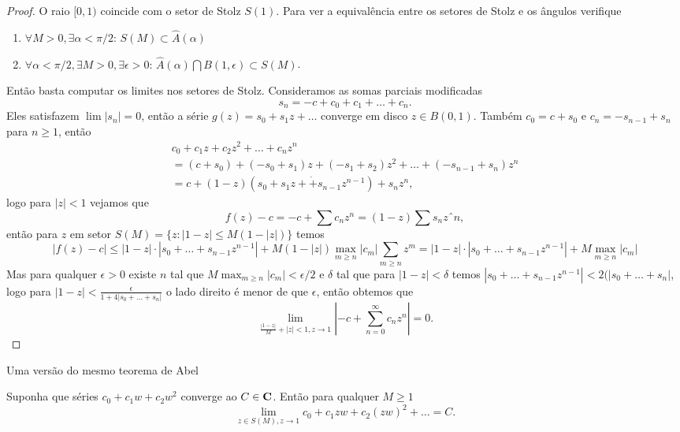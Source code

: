 \begin{proof}
O raio $[0,1)$ coincide com o setor de Stolz $S(1)$.
Para ver a equivalência entre os setores de Stolz e os ângulos verifique
\begin{problema}
\begin{enumerate}
\item $\forall M>0, \exists \alpha<\pi/2: \, S(M) \subset \widehat{A}(\alpha)$
\item $\forall \alpha<\pi/2, \exists M>0,\exists \epsilon>0: \, \widehat{A}(\alpha) \bigcap B(1,\epsilon) \subset S(M)$.
\end{enumerate}
\end{problema}

Então basta computar os limites nos setores de Stolz.
Consideramos as somas parciais modificadas
\[ s_n = -c + c_0 + c_1  + \dots + c_n .\]
Eles satisfazem $\lim |s_n| = 0$, então a série $g(z) = s_0 + s_1 z + \dots$
converge em disco $z\in B(0,1)$.
Também $c_0 = c + s_0$ e $c_n = -s_{n-1} + s_n$ para $n\geq 1$, então
\begin{multline*}
            c_0  +         c_1 z +       c_2 z^2 + \dots +           c_n z^n  
\\ = (c       + s_0) + (-s_0 + s_1)z + (-s_1+s_2)z^2 + \dots + (-s_{n-1}+s_n)z^n
\\ =  c + (1-z)(s_0  +         s_1 z + \dot                 + s_{n-1} z^{n-1}) + s_n z^n,
\end{multline*}
logo para $|z|<1$ vejamos que
\[ f(z) -c = -c + \sum c_n z^n = (1-z) \sum s_n zˆn, \]
então para $z$ em setor $S(M) = \{z : |1-z|\leq M(1-|z|)\}$ temos
\[ |f(z) - c| \leq |1-z|\cdot|s_0+\dots+s_{n-1}z^{n-1}| + M(1-|z|)\max_{m\geq n} |c_m| \sum_{m\geq n} z^m
= |1-z|\cdot|s_0+\dots+s_{n-1}z^{n-1}| + M \max_{m\geq n} |c_m| \]
Mas para qualquer $\epsilon>0$ existe $n$ tal que $M \max_{m\geq n} |c_m| < \epsilon/2$
e $\delta$ tal que para $|1-z|<\delta$ temos $|s_0+\dots+s_{n-1}z^{n-1}|<2(|s_0+\dots+s_n|$,
logo para $|1-z|<\frac{\epsilon}{1+4|s_0+\dots+s_n|}$ o lado direito é menor de que $\epsilon$,
então obtemos que 
\[ \lim_{\frac{|1-z|}M + |z|<1,z\to 1} |-c+\sum_{n=0}^\infty c_n z^n| = 0. \]
\end{proof}

Uma versão do mesmo teorema de Abel
\begin{teorema}
Suponha que séries $c_0 + c_1 w + c_2 w^2$ converge ao $C\in\mathbf{C}$.
Então para qualquer $M\geq 1$
\[ \lim_{z\in S(M),z\to 1} c_0 + c_1 zw + c_2 (zw)^2 + \dots = C. \]
\end{teorema}

